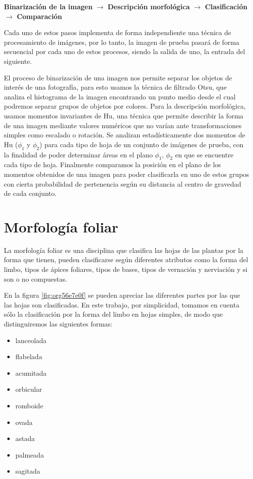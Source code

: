 \documentclass[letter]{article}
\begin{document}
\begin{center}
\textbf{Binarización de la imagen} \(\rightarrow\) \textbf{Descripción morfológica} \(\rightarrow\)
 \textbf{Clasificación} \(\rightarrow\) \textbf{Comparación}
\end{center}

Cada uno de estos pasos implementa de forma independiente una técnica de
procesamiento de imágenes, por lo tanto, la imagen de prueba pasará de forma
secuencial por cada uno de estos procesos, siendo la salida de uno, la entrada
del siguiente.

El proceso de binarización de una imagen nos permite separar los objetos de
interés de una fotografía, para esto usamos la técnica de filtrado Otsu, que
analiza el histograma de la imagen encontrando un punto medio desde el cual
podremos separar grupos de objetos por colores. Para la descripción morfológica,
usamos momentos invariantes de Hu, una técnica que permite describir la forma de
una imagen mediante valores numéricos que no varían ante transformaciones
simples como escalado o rotación. Se analizan estadísticamente dos momentos de
Hu (\(\phi_1\) y \(\phi_2\)) para cada tipo de hoja de un conjunto de imágenes de
prueba, con la finalidad de poder determinar áreas en el plano \(\phi_1\), \(\phi_2\)
en que se encuentre cada tipo de hoja. Finalmente comparamos la posición en el
plano de los momentos obtenidos de una imagen para poder clasificarla en uno de
estos grupos con cierta probabilidad de pertenencia según su distancia al
centro de gravedad de cada conjunto.

\section{Morfología foliar}
\label{sec:org3cf1df1}
La morfología foliar es una disciplina que clasifica las hojas de las plantas
por la forma que tienen, pueden clasificarse según diferentes atributos como la
forma del limbo, tipos de ápices foliares, tipos de bases, tipos de vernación y
nerviación y si son o no compuestas.

En la figura \ref{fig:org56e7e0f} se pueden apreciar las diferentes partes por las que las
hojas son clasificadas. En este trabajo, por simplicidad, tomamos en cuenta sólo
la clasificación por la forma del limbo en hojas simples, de modo que
distinguiremos las siguientes formas:

\begin{itemize}
\item lanceolada
\item flabelada
\item acumitada
\item orbicular
\item romboide
\item ovada
\item astada
\item palmeada
\item sagitada
\end{itemize}
\end{document}
